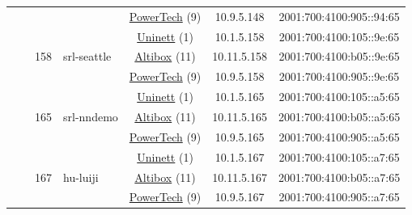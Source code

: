 \begin{small}
\begin{center}
\begin{longtable}{|c|c|c|c|c|c|c|c|}
  &  &  &  & \multicolumn{2}{|c|}{\tiny{\href{http://www.powertech.no}{PowerTech} (9)}} & \tiny{10.9.5.148} & \tiny{2001:700:4100:905::94:65} \\* \cline{3-3}\cline{4-4}\cline{5-5}\cline{6-6}\cline{7-7}\cline{8-8}
  &  & \multirow{3}{*}{\tiny{158}} & \multicolumn{1}{|l|}{\multirow{3}{*}{\tiny{srl-seattle}}} & \multicolumn{2}{|c|}{\tiny{\href{https://www.uninett.no}{Uninett} (1)}} & \tiny{10.1.5.158} & \tiny{2001:700:4100:105::9e:65} \\* \cline{5-5}\cline{6-6}\cline{7-7}\cline{8-8}
  &  &  &  & \multicolumn{2}{|c|}{\tiny{\href{https://www.altibox.no}{Altibox} (11)}} & \tiny{10.11.5.158} & \tiny{2001:700:4100:b05::9e:65} \\* \cline{5-5}\cline{6-6}\cline{7-7}\cline{8-8}
  &  &  &  & \multicolumn{2}{|c|}{\tiny{\href{http://www.powertech.no}{PowerTech} (9)}} & \tiny{10.9.5.158} & \tiny{2001:700:4100:905::9e:65} \\* \cline{3-3}\cline{4-4}\cline{5-5}\cline{6-6}\cline{7-7}\cline{8-8}
  &  & \multirow{3}{*}{\tiny{165}} & \multicolumn{1}{|l|}{\multirow{3}{*}{\tiny{srl-nndemo}}} & \multicolumn{2}{|c|}{\tiny{\href{https://www.uninett.no}{Uninett} (1)}} & \tiny{10.1.5.165} & \tiny{2001:700:4100:105::a5:65} \\* \cline{5-5}\cline{6-6}\cline{7-7}\cline{8-8}
  &  &  &  & \multicolumn{2}{|c|}{\tiny{\href{https://www.altibox.no}{Altibox} (11)}} & \tiny{10.11.5.165} & \tiny{2001:700:4100:b05::a5:65} \\* \cline{5-5}\cline{6-6}\cline{7-7}\cline{8-8}
  &  &  &  & \multicolumn{2}{|c|}{\tiny{\href{http://www.powertech.no}{PowerTech} (9)}} & \tiny{10.9.5.165} & \tiny{2001:700:4100:905::a5:65} \\* \cline{3-3}\cline{4-4}\cline{5-5}\cline{6-6}\cline{7-7}\cline{8-8}
  &  & \multirow{3}{*}{\tiny{167}} & \multicolumn{1}{|l|}{\multirow{3}{*}{\tiny{hu-luiji}}} & \multicolumn{2}{|c|}{\tiny{\href{https://www.uninett.no}{Uninett} (1)}} & \tiny{10.1.5.167} & \tiny{2001:700:4100:105::a7:65} \\* \cline{5-5}\cline{6-6}\cline{7-7}\cline{8-8}
  &  &  &  & \multicolumn{2}{|c|}{\tiny{\href{https://www.altibox.no}{Altibox} (11)}} & \tiny{10.11.5.167} & \tiny{2001:700:4100:b05::a7:65} \\* \cline{5-5}\cline{6-6}\cline{7-7}\cline{8-8}
  &  &  &  & \multicolumn{2}{|c|}{\tiny{\href{http://www.powertech.no}{PowerTech} (9)}} & \tiny{10.9.5.167} & \tiny{2001:700:4100:905::a7:65} \\* \cline{3-3}\cline{4-4}\cline{5-5}\cline{6-6}\cline{7-7}\cline{8-8}

\end{longtable}
\end{center}
\end{small}
